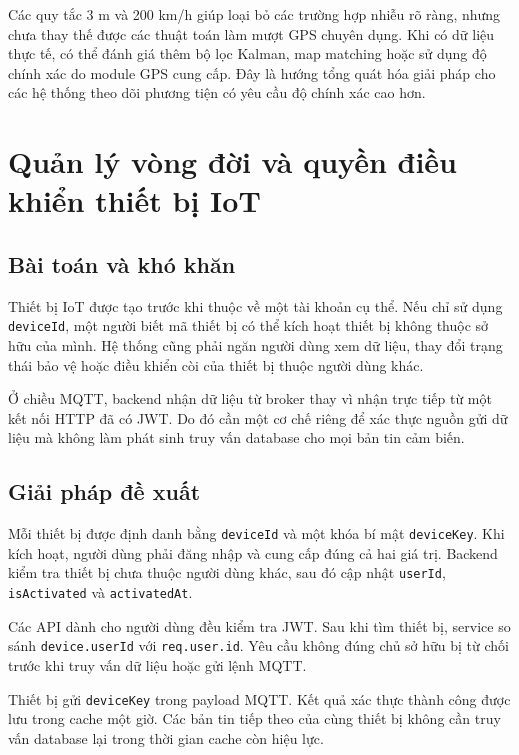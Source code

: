 \documentclass[../DoAn.tex]{subfiles}
\begin{document}
Các quy tắc 3 m và 200 km/h giúp loại bỏ các trường hợp nhiễu rõ ràng, nhưng
chưa thay thế được các thuật toán làm mượt GPS chuyên dụng. Khi có dữ liệu thực
tế, có thể đánh giá thêm bộ lọc Kalman, map matching hoặc sử dụng độ chính xác
do module GPS cung cấp. Đây là hướng tổng quát hóa giải pháp cho các hệ thống
theo dõi phương tiện có yêu cầu độ chính xác cao hơn.

\section{Quản lý vòng đời và quyền điều khiển thiết bị IoT}
\label{sec:quan-ly-thiet-bi-iot}

\subsection{Bài toán và khó khăn}

Thiết bị IoT được tạo trước khi thuộc về một tài khoản cụ thể. Nếu chỉ sử dụng
\texttt{deviceId}, một người biết mã thiết bị có thể kích hoạt thiết bị không
thuộc sở hữu của mình. Hệ thống cũng phải ngăn người dùng xem dữ liệu, thay đổi
trạng thái bảo vệ hoặc điều khiển còi của thiết bị thuộc người dùng khác.

Ở chiều MQTT, backend nhận dữ liệu từ broker thay vì nhận trực tiếp từ một kết
nối HTTP đã có JWT. Do đó cần một cơ chế riêng để xác thực nguồn gửi dữ liệu mà
không làm phát sinh truy vấn database cho mọi bản tin cảm biến.

\subsection{Giải pháp đề xuất}

Mỗi thiết bị được định danh bằng \texttt{deviceId} và một khóa bí mật
\texttt{deviceKey}. Khi kích hoạt, người dùng phải đăng nhập và cung cấp đúng cả
hai giá trị. Backend kiểm tra thiết bị chưa thuộc người dùng khác, sau đó cập
nhật \texttt{userId}, \texttt{isActivated} và \texttt{activatedAt}.

Các API dành cho người dùng đều kiểm tra JWT. Sau khi tìm thiết bị, service so
sánh \texttt{device.userId} với \texttt{req.user.id}. Yêu cầu không đúng chủ sở
hữu bị từ chối trước khi truy vấn dữ liệu hoặc gửi lệnh MQTT.

Thiết bị gửi \texttt{deviceKey} trong payload MQTT. Kết quả
xác thực thành công được lưu trong cache một giờ. Các bản tin tiếp theo của cùng
thiết bị không cần truy vấn database lại trong thời gian cache còn hiệu lực.
\end{document}
